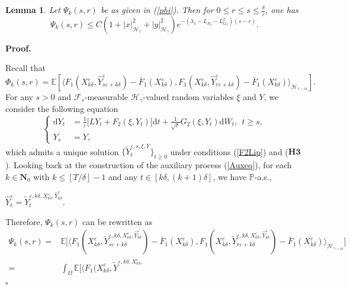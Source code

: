 \documentclass[10pt,a4paper]{article}
\newtheorem{lemma}{Lemma}[section]
\numberwithin{equation}{section}
\newenvironment{proof}[1][\normalfont\bfseries Proof]{%
	\noindent #1.\hspace{0.5em}%
	\ignorespaces%
}{%
	\hfill $\square$%
	\par%
}
\begin{document}
\begin{lemma} \label{phiest}
Let $\Psi_k(s,r)$ be as given in (\ref{phi}). Then for $0 \leq r \leq s \leq \frac \delta\varepsilon$, one has
\begin{equation*}
\Psi_k(s,r) \leq  C(1+|x|_{\mathcal H_\gamma}^2+|y|_{\mathcal H_\gamma}^2)e^{-(\lambda_1-L_{F_2}-L_{G_2}^2)(s-r)}.
\end{equation*}	
\end{lemma}
\begin{proof}
Recall that
\begin{equation*}
	\Phi_k(s,r)=\mathbb E \left[ \langle F_1(X_{k\delta}^\varepsilon,\hat{Y}_{s\varepsilon+k\delta}^\varepsilon)-\bar{F}_1(X_{k\delta}^\varepsilon),F_1(X_{k\delta}^\varepsilon,\hat{Y}_{r\varepsilon+k\delta}^\varepsilon)-\bar{F}_1(X_{k\delta}^\varepsilon) \rangle_{\mathcal H_{\gamma-\alpha}} \right].
\end{equation*}
For any $s>0$ and $\mathcal F_s$-measurable $\mathcal H_\gamma$-valued random variables $\xi$ and $Y$, we consider the following equation
$$
\left\{ \begin{aligned}
	\mathrm{d} Y_t&=\frac 1\varepsilon \big[L Y_t+F_2(\xi,Y_t)\big]\mathrm{d} t+\frac 1{\sqrt{\varepsilon}}G_2(\xi,Y_t)\mathrm{d} W_t, ~~t\geq s,\\
	Y_s&=Y,
\end{aligned} \right.
$$
which admits a unique solution $\{\widetilde{Y}^{\varepsilon,s,\xi,Y}_t\}_{t\geq0}$ under conditions (\ref{F2Lip}) and ($\mathbf{H3}$).
Looking back at the construction of the auxiliary process (\ref{Auxeq}), for each $k\in\mathbf N_0$ with $k \leq [T/\delta]-1$ and any $t\in[k\delta,(k+1)\delta]$, we have $\mathbb P$-a.s.,
\begin{center}
	$\hat{Y}^\varepsilon_t=\widetilde{Y}^{\varepsilon,k\delta,X^\varepsilon_{k\delta},\hat{Y}^\varepsilon_{k\delta}}_t$.
\end{center}
Therefore, $\Psi_k(s,r)$ can be rewritten as
\begin{align*}
	\Psi_k(s,r)
	=&\mathbb E\Big[ \big\langle F_1(X^\varepsilon_{k\delta},\widetilde{Y}^{\varepsilon,k\delta,X^\varepsilon_{k\delta}, \hat{Y}^\varepsilon_{k\delta}}_{s\varepsilon+k\delta})-\bar{F}_1(X^\varepsilon_{k\delta}),F_1(X^\varepsilon_{k\delta},\widetilde{Y}^{\varepsilon,k\delta,X^\varepsilon_{k\delta},
		\hat{Y}^\varepsilon_{k\delta}}_{r\varepsilon+k\delta})-
	\bar{F}_1(X^\varepsilon_{k\delta}) \big\rangle_{\mathcal H_{\gamma-\alpha}}\Big] \\
	=&\int_{\Omega}\mathbb E\Big[ \big\langle F_1(X^\varepsilon_{k\delta},\widetilde{Y}^{\varepsilon,k\delta,X^\varepsilon_{k\delta},
}
\end{align*}
\end{proof}
\end{document}

